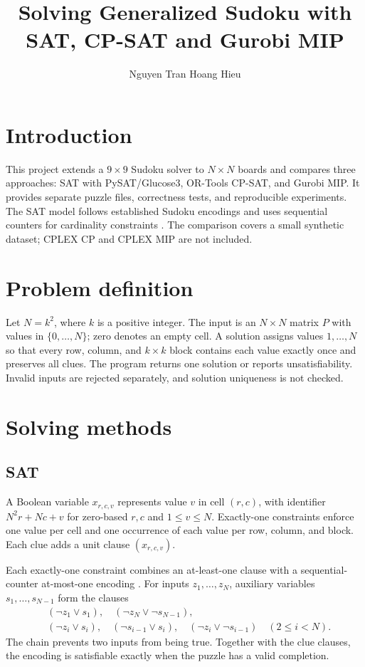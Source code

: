 \documentclass[a4paper,fleqn]{cas-sc}
\begin{document}
\title [mode=title]{Solving Generalized Sudoku with SAT, CP-SAT and Gurobi MIP}
\author{Nguyen Tran Hoang Hieu}
\maketitle

\section{Introduction}
This project extends a \(9\times9\) Sudoku solver to \(N\times N\) boards and compares three approaches: SAT with PySAT/Glucose3, OR-Tools CP-SAT, and Gurobi MIP. It provides separate puzzle files, correctness tests, and reproducible experiments. The SAT model follows established Sudoku encodings \cite{lynce} and uses sequential counters for cardinality constraints \cite{sinz}. The comparison covers a small synthetic dataset; CPLEX CP and CPLEX MIP are not included.

\section{Problem definition}
Let \(N=k^2\), where \(k\) is a positive integer. The input is an \(N\times N\) matrix \(P\) with values in \(\{0,\ldots,N\}\); zero denotes an empty cell. A solution assigns values \(1,\ldots,N\) so that every row, column, and \(k\times k\) block contains each value exactly once and preserves all clues. The program returns one solution or reports unsatisfiability. Invalid inputs are rejected separately, and solution uniqueness is not checked.

\section{Solving methods}
\subsection{SAT}
A Boolean variable \(x_{r,c,v}\) represents value \(v\) in cell \((r,c)\), with identifier \(N^2r+Nc+v\) for zero-based \(r,c\) and \(1\le v\le N\). Exactly-one constraints enforce one value per cell and one occurrence of each value per row, column, and block. Each clue adds a unit clause \((x_{r,c,v})\).

Each exactly-one constraint combines an at-least-one clause with a sequential-counter at-most-one encoding \cite{sinz}. For inputs \(z_1,\ldots,z_N\), auxiliary variables \(s_1,\ldots,s_{N-1}\) form the clauses
\begin{align}
 &(\neg z_1\lor s_1),\quad(\neg z_N\lor\neg s_{N-1}),\\
 &(\neg z_i\lor s_i),\quad(\neg s_{i-1}\lor s_i),\quad
   (\neg z_i\lor\neg s_{i-1}) \quad (2\le i<N).
\end{align}
The chain prevents two inputs from being true. Together with the clue clauses, the encoding is satisfiable exactly when the puzzle has a valid completion.
\end{document}
